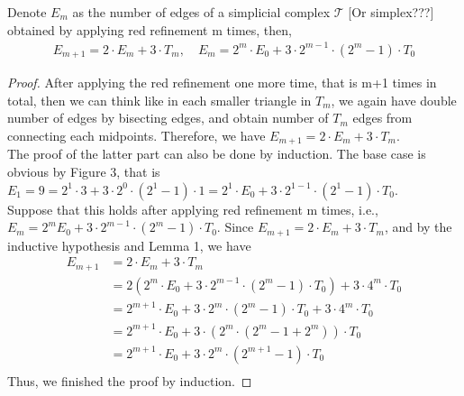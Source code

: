     \begin{lemma}
    Denote $E_{m}$ as the number of edges of a simplicial complex $\mathcal{T}$ [Or simplex???] obtained by applying red refinement m times, then,
    \begin{align*}
    E_{m+1} = 2 \cdot E_m + 3 \cdot T_m, \quad E_{m} = 2^{m}\cdot E_0 + 3 \cdot2^{m-1}\cdot(2^{m} -1)\cdot T_0
    \end{align*}
    \end{lemma}
    \begin{proof}
    After applying the red refinement one more time, that is m+1 times in total, then we can think like in each smaller triangle in $T_m$, we again have double number of edges by bisecting edges, and obtain number of $T_m$ edges from connecting each midpoints. Therefore, we have $E_{m+1} = 2\cdot E_m + 3\cdot T_m$.\\
    The proof of the latter part can also be done by induction. The base case is obvious by Figure 3, that is $E_1 = 9 = 2^1\cdot 3 + 3\cdot 2^0 \cdot (2^1 - 1)\cdot1 = 2^1\cdot E_0 + 3\cdot2^{1-1}\cdot(2^1 - 1)\cdot T_0$.\\
    Suppose that this holds after applying red refinement m times, i.e., $E_{m} = 2^{m} E_0 + 3 \cdot2^{m-1}\cdot(2^{m} -1)\cdot T_0$. Since $E_{m+1} = 2 \cdot E_m + 3 \cdot T_m$, and by the inductive hypothesis and Lemma 1, we have
    \begin{align*}
    E_{m+1} &= 2 \cdot E_m + 3 \cdot T_m \\
    &= 2(2^{m}\cdot E_0 + 3 \cdot2^{m-1}\cdot(2^{m} -1)\cdot T_0) + 3\cdot 4^m\cdot T_0\\
    &= 2^{m+1}\cdot E_0 + 3\cdot2^m\cdot(2^m - 1)\cdot T_0 + 3\cdot4^m\cdot T_0\\
    &= 2^{m+1}\cdot E_0 + 3\cdot(2^m\cdot(2^m -1 + 2^m))\cdot T_0\\
    &=2^{m+1}\cdot E_0 + 3\cdot2^m\cdot(2^{m+1}-1)\cdot T_0\\
    \end{align*}
    Thus, we finished the proof by induction.
    \end{proof}

